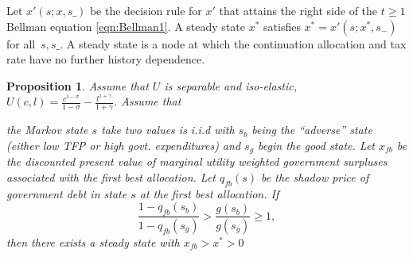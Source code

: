 \documentclass[12pt]{article}
\newcommand{\apb}[1]{\textcolor{magenta}{$^{\textrm{apb}}${#1}}}
\newcommand{\tjs}[1]{\textcolor{red}{$^{\textrm{tjs}}${#1}}}
\newtheorem{proposition}[theorem]{Proposition}
\begin{document}
Let $x'\left( s;{x},s\_\right) $ be the decision rule for $x'$ that attains the right side of the $t\geq1$ Bellman equation
\eqref{eqn:Bellman1}.  A steady state  ${x}^{*} $  satisfies ${ x}^{*}  =x' \left( s;{x}^{*},s_{-}\right) $ for all $%
\,s,s\_$.
A steady state is a node at which the  continuation allocation and tax rate have no further history dependence.

\begin{proposition}\label{prop:existenceU}
Assume that $U$ is  separable and iso-elastic,	 $U(c,l) = \frac{c^{1-\sigma}}{1-\sigma} -\frac{ l^{1+\gamma}}{1+\gamma}$.
Assume that


	 the Markov state $s$ take two values is  i.i.d with $s_b$  being the ``adverse'' state (either low TFP or high govt. expenditures)
and $s_g$ begin the good state.
		Let $x_{fb}$ be the discounted present value of marginal utility weighted government surpluses associated with the first best allocation.
	 Let $q_{fb}(s)$ be the shadow price of government debt in state $s$ at the first best allocation.
	If
	\begin{equation}\label{eqn:prop52sufficient}
		\frac{1-q_{fb}(s_b)}{1-q_{fb}(s_g)} > \frac{g(s_b)}{g(s_g)}\geq 1 ,
	\end{equation}
		then there exists a steady state with $x_{fb}>x^*>0$
		\end{proposition}
\end{document}
